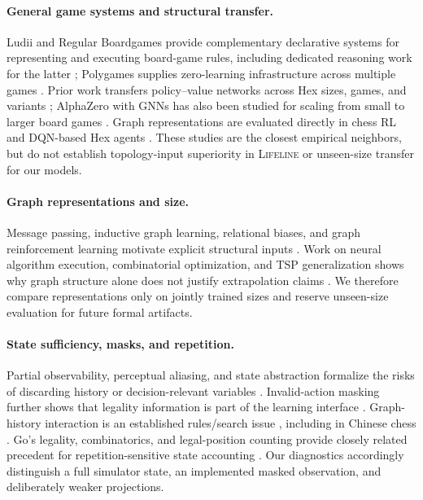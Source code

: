 \documentclass[10pt,letterpaper]{article}
\newcommand{\lifeline}{\textsc{Lifeline}}
\begin{document}
\paragraph{General game systems and structural transfer.}
Ludii and Regular Boardgames provide complementary declarative systems for
representing and executing board-game rules, including dedicated reasoning
work for the latter \citep{piette2020ludii,kowalski2019regular,
kowalski2020efficient}; Polygames supplies zero-learning infrastructure across
multiple games \citep{cazenave2021polygames}. Prior work transfers
policy--value networks across Hex sizes, games, and variants
\citep{gao2019transferable,soemers2021transfer}; AlphaZero with GNNs has also
been studied for scaling from small to larger board games
\citep{benassayag2021smalllarge}. Graph representations are evaluated directly
in chess RL and DQN-based Hex agents
\citep{rigaux2024chessgraph,keller2023hexgnn}. These studies are the closest
empirical neighbors, but do not establish topology-input superiority in
\lifeline{} or unseen-size transfer for our models.

\paragraph{Graph representations and size.}
Message passing, inductive graph learning, relational biases, and graph
reinforcement learning motivate explicit structural inputs
\citep{gilmer2017neural,hamilton2017inductive,battaglia2018relational,
jiang2018graph}. Work on neural algorithm execution, combinatorial
optimization, and TSP generalization shows why graph structure alone does not
justify extrapolation claims \citep{xu2019what,joshi2020learning}. We therefore compare representations only
on jointly trained sizes and reserve unseen-size evaluation for future formal
artifacts.

\paragraph{State sufficiency, masks, and repetition.}
Partial observability, perceptual aliasing, and state abstraction formalize the
risks of discarding history or decision-relevant variables
\citep{kaelbling1998planning,chrisman1992perceptual,
givan2003equivalence,abel2017near}. Invalid-action masking further shows that
legality information is part of the learning interface
\citep{huang2022invalid}. Graph-history interaction is an established
rules/search issue \citep{campbell1985graphhistory,kishimoto2004graph},
including in Chinese chess \citep{wu2006graphhistory}. Go's legality,
combinatorics, and legal-position counting provide closely related precedent
for repetition-sensitive state accounting
\citep{tromp2007combinatorics,tromp2016number}. Our
diagnostics accordingly distinguish a full simulator
state, an implemented masked observation, and deliberately weaker projections.
\end{document}

